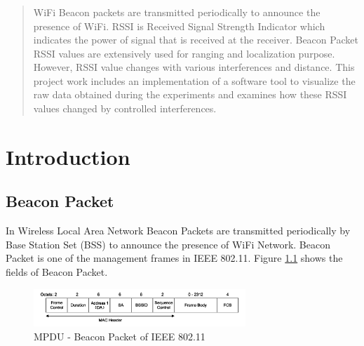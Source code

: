 \documentclass[11pt,a4paper,headinclude,footinclude,chapterprefix=on]{scrreprt}
\begin{document}
\begin{abstract}
	\subsection*{\abstractname} WiFi Beacon packets are transmitted periodically to announce the presence of WiFi. RSSI is Received Signal Strength Indicator which indicates the power of signal that is received at the receiver. Beacon Packet RSSI values are extensively used for ranging and localization purpose. However, RSSI value changes with various interferences and distance. This project work includes an implementation of a software tool to visualize the raw data obtained during the experiments and examines how these RSSI values changed by controlled interferences. 
\end{abstract}

\tableofcontents

\chapter{Introduction} 
\section{Beacon Packet} In Wireless Local Area Network Beacon Packets are transmitted periodically by Base Station Set (BSS) to announce the presence of WiFi Network. Beacon Packet is one of the management frames in IEEE 802.11. Figure \ref{fig:beacon} shows the fields of Beacon Packet. 
\begin{figure}
	[!h] \centering 
	\includegraphics[width=8cm]{Images/beacon_frame.png} \caption{MPDU - Beacon Packet of IEEE 802.11} \label{fig:beacon} 
\end{figure}
\end{document}
